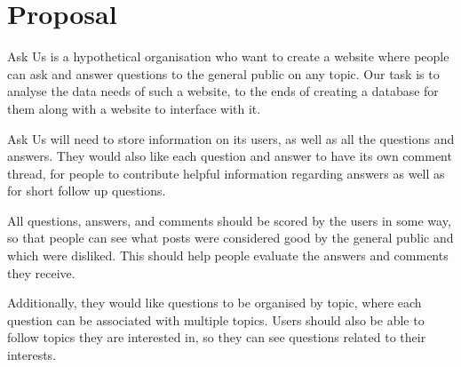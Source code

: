 \section{Proposal}

Ask Us is a hypothetical organisation who want to create a website where people can ask and answer questions to the general public on any topic. Our task is to analyse the data needs of such a website, to the ends of creating a database for them along with a website to interface with it.

Ask Us will need to store information on its users, as well as all the questions and answers. They would also like each question and answer to have its own comment thread, for people to contribute helpful information regarding answers as well as for short follow up questions.

All questions, answers, and comments should be scored by the users in some way, so that people can see what posts were considered good by the general public and which were disliked. This should help people evaluate the answers and comments they receive.

Additionally, they would like questions to be organised by topic, where each question can be associated with multiple topics. Users should also be able to follow topics they are interested in, so they can see questions related to their interests.